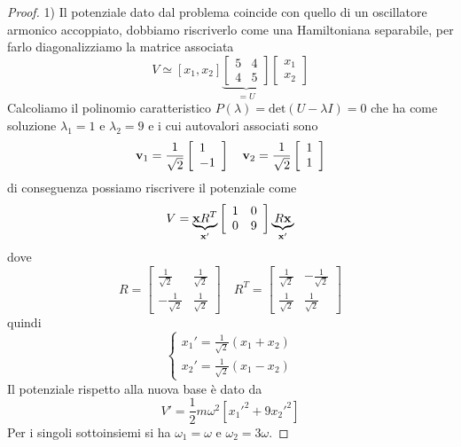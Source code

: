 \begin{proof}
	1) Il potenziale dato dal problema coincide con quello di un oscillatore armonico accoppiato, dobbiamo riscriverlo come una Hamiltoniana separabile, per farlo diagonalizziamo la matrice associata
\begin{equation*}
	V \simeq  [x_1,x_2] \underbrace{\left[\begin{array}{cc}
		5 & 4 \\ 4 & 5
	\end{array}\right]}_{=U}\left [\begin{array}{l}
		x_1 \\ x_2
	\end{array}\right]
\end{equation*}
Calcoliamo il polinomio caratteristico $P(\lambda) = \text{det}(U - \lambda I) = 0$ che ha come soluzione $\lambda_1 = 1$ e $\lambda_2 = 9$ e i cui autovalori associati sono
\begin{equation*}
	\bold{v}_1 = \frac{1}{\sqrt{2}}\left[\begin{array}{l}
		1 \\ -1
	\end{array}\right] \quad 	\bold{v}_2 =\frac{1}{\sqrt{2}} \left[\begin{array}{l}
		1 \\ 1
	\end{array}\right]
\end{equation*}
di conseguenza possiamo riscrivere il potenziale come
\begin{equation*}
	V = \underbrace{\bold{x}R^T}_{\bold{x}'} \left[\begin{array}{cc}
		1 & 0 \\ 0 & 9 
	\end{array}\right]\underbrace{R \bold{x}}_{\bold{x}'}
\end{equation*} 
dove 
\begin{equation*}
	R = \left[\begin{array}{cc}
		\frac{1}{\sqrt{2}} & \frac{1}{\sqrt{2}} \\ -\frac{1}{\sqrt{2}} & \frac{1}{\sqrt{2}} 
	\end{array}\right] \quad R^T = \left[\begin{array}{cc}
		\frac{1}{\sqrt{2}} & -\frac{1}{\sqrt{2}} \\ \frac{1}{\sqrt{2}} & \frac{1}{\sqrt{2}} 
	\end{array}\right] 
\end{equation*}
quindi
\begin{equation*}
	\left \{ \begin{array}{l}
		x_1' = \frac{1}{\sqrt{2}}(x_1 + x_2)\\[0.3cm]
		x_2' = \frac{1}{\sqrt{2}}(x_1-x_2)
	\end{array}\right.
\end{equation*}
Il potenziale rispetto alla nuova base \`e dato da 
\begin{equation*}
	V' = \frac{1}{2}m\omega^2[x_1'^2+9x_2'^2]
\end{equation*}
Per i singoli sottoinsiemi si ha $\omega_1 = \omega$ e $\omega_2 = 3\omega$.


\end{proof}
